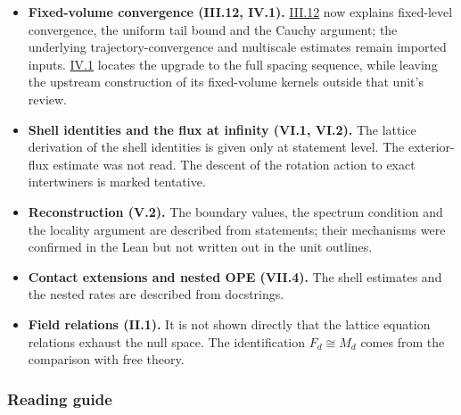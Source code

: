 \documentclass[
  letterpaper,
  11pt]{article}
\providecommand{\tightlist}{%
  \setlength{\itemsep}{0pt}\setlength{\parskip}{0pt}}
\begin{document}
\begin{itemize}
  \begin{itemize}
  \tightlist
  \item
    The correspondence between the outputs of the one-step bounds
    (III.10) and the norms restored by the reset (III.9) is not written
    out.
  \item
    Several hypotheses of the step were read only as statements.
  \item
    The cluster expansion is proved for real weights (III.5), while the
    fixed-volume argument uses complex tuning.
  \end{itemize}
\item
  \textbf{Fixed-volume convergence (III.12, IV.1).}
  \href{https://github.com/scottnarmstrong/yang-mills-informalization/blob/main/outline/units/III-12.md\#7-what-remains-unexplained}{III.12}
  now explains fixed-level convergence, the uniform tail bound and the
  Cauchy argument; the underlying trajectory-convergence and multiscale
  estimates remain imported inputs.
  \href{https://github.com/scottnarmstrong/yang-mills-informalization/blob/main/outline/units/IV-1.md}{IV.1}
  locates the upgrade to the full spacing sequence, while leaving the
  upstream construction of its fixed-volume kernels outside that unit's
  review.
\item
  \textbf{Shell identities and the flux at infinity (VI.1, VI.2).} The
  lattice derivation of the shell identities is given only at statement
  level. The exterior-flux estimate was not read. The descent of the
  rotation action to exact intertwiners is marked tentative.
\item
  \textbf{Reconstruction (V.2).} The boundary values, the spectrum
  condition and the locality argument are described from statements;
  their mechanisms were confirmed in the Lean but not written out in the
  unit outlines.
\item
  \textbf{Contact extensions and nested OPE (VII.4).} The shell
  estimates and the nested rates are described from docstrings.
\item
  \textbf{Field relations (II.1).} It is not shown directly that the
  lattice equation relations exhaust the null space. The identification
  \(F_d\cong M_d\) comes from the comparison with free theory.
\end{itemize}

\subsubsection{Reading guide}\label{reading-guide}
\end{document}
